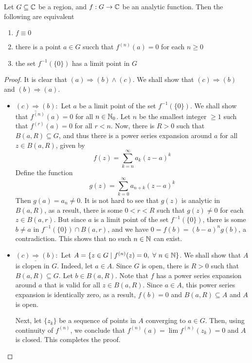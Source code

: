 \begin{theorem}
    Let $G\subseteq\mathbb{C}$ be a region, and $f: G\to\mathbb{C}$ be an analytic function. Then the following are equivalent 
    \begin{enumerate}[label=(\alph*)]
        \item $f\equiv 0$ 
        \item there is a point $a\in G$ succh that $f^{(n)}(a) = 0$ for each $n\ge 0$ 
        \item the set $f^{-1}(\{0\})$ has a limit point in $G$ 
    \end{enumerate}
\end{theorem}
\begin{proof}
It is clear that $(a)\Longrightarrow(b)\wedge(c)$. We shall show that $(c)\Longrightarrow(b)$ and $(b)\Longrightarrow(a)$.
\begin{itemize}
\item $\underline{(c)\Longrightarrow(b)}:$ Let $a$ be a limit point of the set $f^{-1}(\{0\})$. We shall show that $f^{(n)}(a) = 0$ for all $n\in\mathbb{N}_0$. Let $n$ be the smallest integer $\ge 1$ such that $f^{(r)}(a) = 0$ for all $r < n$. Now, there is $R > 0$ such that $B(a,R)\subseteq G$, and thus there is a power series expansion around $a$ for all $z\in B(a,R)$, given by 
\begin{equation*}
    f(z) = \sum_{k = n}^\infty a_k(z - a)^k
\end{equation*}
Define the function
\begin{equation*}
    g(z) = \sum_{k = 0}^\infty a_{n + k}(z - a)^k
\end{equation*}
Then $g(a) = a_n\ne 0$. It is not hard to see that $g(z)$ is analytic in $B(a,R)$, as a result, there is some $0 < r < R$ such that $g(z)\ne 0$ for each $z\in B(a,r)$. But since $a$ is a limit point of the set $f^{-1}(\{0\})$, there is some $b\ne a$ in $f^{-1}(\{0\})\cap B(a,r)$, and we have $0 = f(b) = (b - a)^ng(b)$, a contradiction. This shows that no such $n\in\mathbb{N}$ can exist.

\item $\underline{(c)\Longrightarrow(b)}:$ Let $A = \{z\in G\mid f^{(n)}(z) = 0,~\forall~n\in\mathbb{N}\}$. We shall show that $A$ is clopen in $G$. Indeed, let $a\in A$. Since $G$ is open, there is $R > 0$ such that $B(a,R)\subseteq G$. Let $b\in B(a,R)$. Note that $f$ has a power series expansion around $a$ that is valid for all $z\in B(a,R)$. Since $a\in A$, this power series expansion is identically zero, as a result, $f(b) = 0$ and $B(a,R)\subseteq A$ and $A$ is open.

Next, let $\{z_k\}$ be a sequence of points in $A$ converging to $a\in G$. Then, using continuity of $f^{(n)}$, we conclude that $f^{(n)}(a) = \lim f^{(n)}(z_k) = 0$ and $A$ is closed. This completes the proof.
\end{itemize}
\end{proof}

